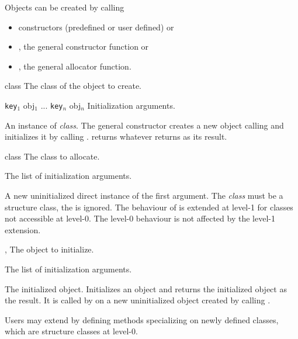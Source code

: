 \begin{optDefinition}
Objects can be created by calling
%
\begin{itemize}
    \item constructors (predefined or user defined) or
    \item {}, the general constructor function or
    \item {}, the general allocator function.
\end{itemize}

%
\begin{arguments}
    \item[class] The class of the object to create.
    \item[{\tt key$_1$} obj$_1$ ... {\tt key$_n$} obj$_n$] Initialization
    arguments.
\end{arguments}
%
\result%
An instance of {\em class}.
%
\remarks%
The general constructor  creates a new object calling
 and initializes it by calling
.  returns whatever
 returns as its result.

%
\begin{arguments}
    \item[class] The class to allocate.
    \item[\scref{initlist}] The list of initialization arguments.
\end{arguments}
%
\result%
A new uninitialized direct instance of the first argument.
%
\remarks%
The {\em class\/} must be a structure class, the  is ignored.
The behaviour of  is extended at level-1 for classes not
accessible at level-0. The level-0 behaviour is not affected by the level-1
extension.

%
\begin{genericargs}
    \item[\scref{object}, \classref{object}] The object to initialize.
    \item[\scref{initlist}] The list of initialization arguments.
\end{genericargs}
%
\result%
The initialized object.
%
\remarks%
Initializes an object and returns the initialized object as the result.  It is
called by  on a new uninitialized object created by calling
.

Users may extend  by defining methods specializing on
newly defined classes, which are structure classes at level-0.


\end{optDefinition}
